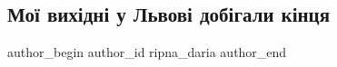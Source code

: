  
 
 
 
 

\subsection{Мої вихідні у Львові добігали кінця}
\label{sec:06_08_2023.fb.ripna_daria.1.moji_vyhidni_u_lvovi_dobigaly_kincja}

\ifcmt
 author_begin
   author_id ripna_daria
 author_end
\fi

